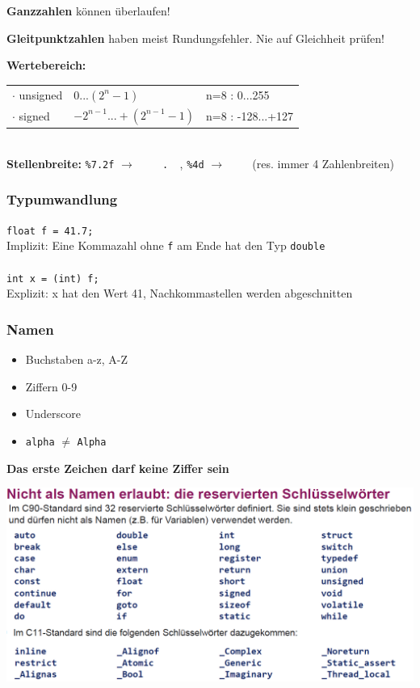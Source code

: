  			\textbf{Ganzzahlen} können überlaufen!

			\textbf{Gleitpunktzahlen} haben meist Rundungsfehler. Nie auf Gleichheit prüfen!

			\textbf{Wertebereich:} \\
			\begin{tabular}{lll}
				$\cdot$ unsigned & 0...$(2^n-1)$               & n=8 : 0...255 \\
				$\cdot$ signed   & $-2^{n-1}...+(2^{n-1}-1)$ & n=8 : -128...+127 \\
			\end{tabular}
			\\
			\textbf{Stellenbreite:} \verb|%7.2f| $\rightarrow$ \verb*|    .  |, \verb|%4d| $\rightarrow$ \verb*|    |(res. immer 4 Zahlenbreiten)

		\subsubsection{Typumwandlung}
			\verb|float f = 41.7;|\\
			Implizit: Eine Kommazahl ohne \verb|f| am Ende hat den Typ \verb|double|
			\\
			\\
			\verb|int x = (int) f;|\\
			Explizit: x hat den Wert 41, Nachkommastellen werden abgeschnitten

		\subsubsection{Namen}
			\begin{minipage}{0.35\linewidth}
				\begin{itemize}
					\item Buchstaben a-z, A-Z
					\item Ziffern 0-9
					\item Underscore
					\item \verb|alpha| $\neq$ \verb|Alpha|
				\end{itemize}
				\textbf{Das erste Zeichen darf keine Ziffer sein}
			\end{minipage}
			\hfill
			\begin{minipage}{0.6\linewidth}
				\includegraphics[width=1\linewidth]{Bilder/verbotene_namen.png}
			\end{minipage}

